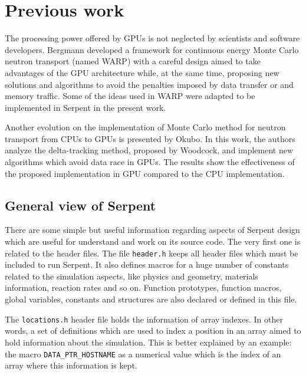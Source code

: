 \documentclass[twoside,a4paper,12pt,english,draft]{anstrans}
\begin{document}
\section{Previous work}

The processing power offered by GPUs is not neglected by scientists and software developers.
Bergmann\cite{Bergmann2014} developed a framework for continuous energy Monte Carlo neutron
transport (named WARP) with a careful design aimed to take advantages of the GPU architecture while, at the
same time, proposing new solutions and algorithms to avoid the penalties imposed by data transfer
or and memory traffic. Some of the ideas used in WARP were adapted to be implemented in Serpent in
the present work.

Another evolution on the implementation of Monte Carlo method for neutron transport from CPUs to GPUs
is presented by Okubo\cite{Okubo2016}. In this work, the authors analyze the delta-tracking method,
proposed by Woodcock\cite{Woodcock1965}, and implement new algorithms which avoid data race in
GPUs. The results show the effectiveness of the proposed implementation in GPU compared to the CPU
implementation.


\subsection{General view of Serpent}

There are some simple but useful information regarding aspects of Serpent design which are
useful for understand and work on its source code. The very first one is related to the header
files. The file \texttt{header.h} keeps all header files which must be included to run Serpent.
It also defines macros for a huge number of constants related to the simulation aspects, like
physics and geometry, materials information, reaction rates and so on. Function prototypes, function
macros, global variables, constants and structures are also declared or defined in this file.

The \texttt{locations.h} header file holds the information of array indexes. In other words, a set of
definitions which are used to index a position in an array aimed to hold information about the simulation.
This is better explained by an example: the macro \texttt{DATA\_PTR\_HOSTNAME} as a numerical value
which is the index of an array where this information is kept.
\end{document}
